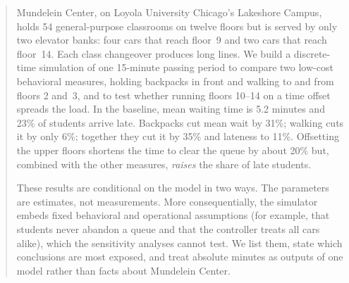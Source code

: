 \begin{abstract}
Mundelein Center, on Loyola University Chicago's Lakeshore Campus, holds 54 general-purpose classrooms on twelve
floors but is served by only two elevator banks: four cars that reach floor~9 and two cars that reach floor~14.
Each class changeover produces long lines. We build a discrete-time simulation of one 15-minute passing period
to compare two low-cost behavioral measures, holding backpacks in front and walking to and from floors 2 and~3,
and to test whether running floors 10--14 on a time offset spreads the load. In the baseline, mean waiting time
is 5.2 minutes and 23\% of students arrive late. Backpacks cut mean wait by 31\%; walking cuts it by only 6\%;
together they cut it by 35\% and lateness to 11\%. Offsetting the upper floors shortens the time to clear the
queue by about 20\% but, combined with the other measures, \emph{raises} the share of late students.

These results are conditional on the model in two ways. The parameters are estimates, not measurements. More
consequentially, the simulator embeds fixed behavioral and operational assumptions (for example, that students
never abandon a queue and that the controller treats all cars alike), which the sensitivity analyses cannot test.
We list them, state which conclusions are most exposed, and treat absolute minutes as outputs of one model rather
than facts about Mundelein Center.
\end{abstract}
